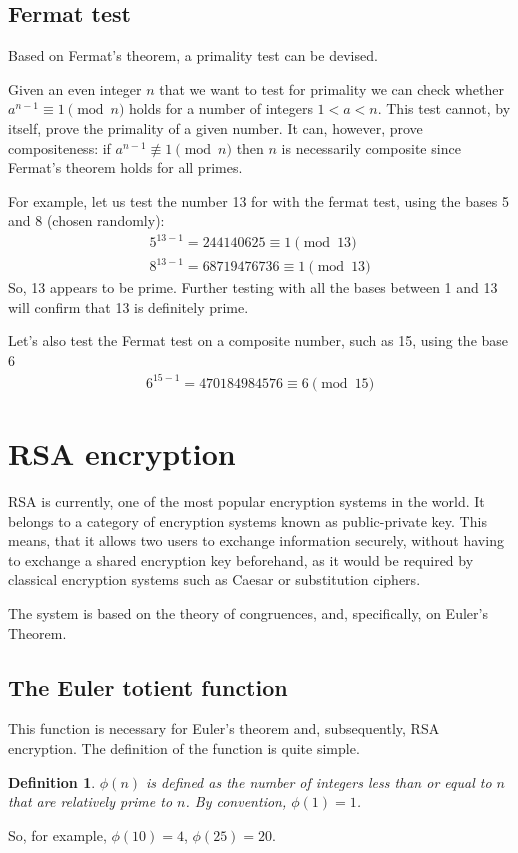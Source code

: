 \documentclass[12pt, titlepage]{article}
\newtheorem*{definition}{Definition}
\begin{document}
    \subsection{Fermat test}
    Based on Fermat's theorem, a primality test can be devised.

    Given an even integer $n$ that we want to test for primality we can check whether
    $a^{n-1} \equiv 1 \pmod{n}$ holds for a number of integers $1<a<n$.  This test cannot,
    by itself, prove the primality of a given number. It can, however, prove compositeness:
    if $a^{n-1} \not\equiv 1 \pmod{n}$ then $n$ is necessarily composite since Fermat's
    theorem holds for all primes.

    For example, let us test the number 13 for with the fermat test, using the bases 5 and 8
    (chosen randomly):
    \begin{align*}
        5^{13-1} = 244140625   \equiv 1 \pmod{13}\\
        8^{13-1} = 68719476736 \equiv 1 \pmod{13}
    \end{align*}
    So, 13 appears to be prime. Further testing with all the bases between 1 and 13 will
    confirm that 13 is definitely prime.

    Let's also test the Fermat test on a composite number, such as 15, using the base 6
    \begin{align*}
        6^{15-1} = 470184984576 \equiv 6 \pmod{15}
    \end{align*}



\section{RSA encryption}
RSA is currently, one of the most popular encryption systems in the world.  It belongs to a
category of encryption systems known as public-private key.  This means, that it allows two
users to exchange information securely, without having to exchange a shared encryption key
beforehand, as it would be required by classical encryption systems such as Caesar or
substitution ciphers. 

The system is based on the theory of congruences, and, specifically, on Euler's Theorem.

    \subsection{The Euler totient function}
    This function is necessary for Euler's theorem and, subsequently, RSA encryption. The
    definition of the function is quite simple.
    \begin{definition}
        $\phi(n)$ is defined as the \emph{number} of integers less than or equal to $n$ that
        are relatively prime to $n$. By convention, $\phi(1) = 1$.
    \end{definition}
    So, for example, $\phi(10) = 4$, $\phi(25) = 20$.
\end{document}
